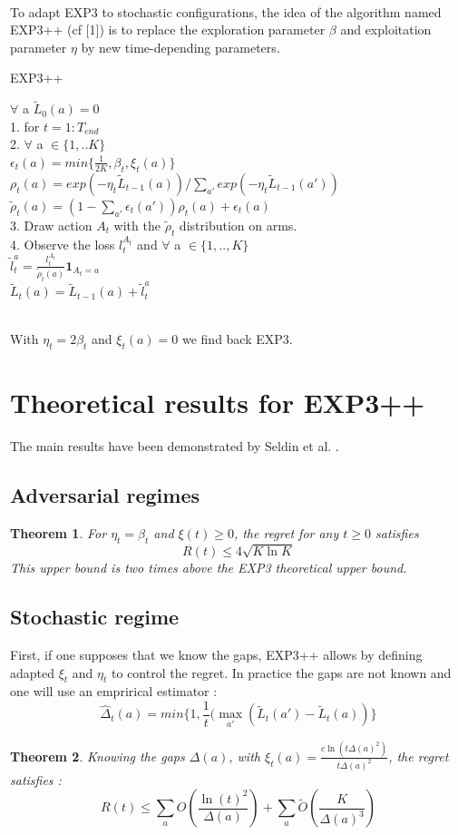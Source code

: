 \documentclass[11pt]{article}
\newtheorem{theorem}{Theorem}
\begin{document}
~\\
To adapt EXP3 to stochastic configurations, the idea of the algorithm named EXP3++ (cf [1]) is to replace the exploration parameter $\beta$ and exploitation parameter $\eta$ by new time-depending parameters.
~\\
\FloatBarrier
\begin{algorithm}
\caption{EXP3++}\label{RS}
$\forall$ a $\tilde{L}_{0}(a)=0$\\
1. for $t=1:T_{end}$~\\
2. $\forall$ a $\in \{1,..K\}$\\
 $\epsilon_{t}(a)=min\{\frac{1}{2K}, \beta_{t}, \xi_{t}(a)\}$ \\
$\rho_{t}(a)=exp(-\eta_{t}\tilde{L}_{t-1}(a))/\sum_{a'}exp(-\eta_{t}\tilde{L}_{t-1}(a'))$\\
$\tilde{\rho}_{t}(a)=(1-\sum_{a'}\epsilon_{t}(a'))\rho_{t}(a)+\epsilon_{t}(a)$\\
3. Draw action $A_{t}$ with the $\tilde{\rho}_{t}$ distribution on arms.~\\
4. Observe the loss $l_{t}^{A_{t}}$ and $\forall$ a $\in \{1,..,K\}$\\
$\tilde{l}_{t}^{a}=\frac{l_{t}^{A_{t}}}{\tilde{\rho}_{t}(a)} \textbf{1}_{A_{t}=a}$\\
$\tilde{L}_{t}(a)=\tilde{L}_{t-1}(a)+\tilde{l}_{t}^{a}$
\end{algorithm}
\FloatBarrier~\\
With $\eta_{t}=2\beta_{t}$ and $\xi_{t}(a)=0$ we find back EXP3.


\section*{Theoretical results for EXP3++}
The main results have been demonstrated by Seldin et al. \cite{Seld12}.

\subsection*{Adversarial regimes}

\begin{theorem}
For $\eta_{t}=\beta_{t}$ and $\xi(t) \geq 0$, the regret for any $t\geq0$ satisfies $$R(t) \leq 4\sqrt{K\ln K}$$ This upper bound is two times above the EXP3 theoretical upper bound.
\end{theorem}

\subsection*{Stochastic regime}
First, if one supposes that we know the gaps, EXP3++ allows by defining adapted $\xi_{t}$ and $\eta_{t}$ to control the regret. In practice the gaps are not known and one will use an emprirical estimator : $$\hat{\Delta}_{t}(a)=min\{1,\frac{1}{t}(\max_{a'}(\tilde{L}_{t}(a')-\tilde{L}_{t}(a))\}$$
\begin{theorem}
Knowing the gaps $\Delta(a)$, with $\xi_{t}(a)=\frac{c\ln(t\Delta(a)^{2})}{t\Delta(a)^{2}}$, the regret satisfies :
$$R(t) \leq \sum_{a} O(\frac{\ln(t)^{2}}{\Delta(a)})+\sum_{a}\tilde{O}(\frac{K}{\Delta(a)^{3}})$$
\end{theorem}
\end{document}
